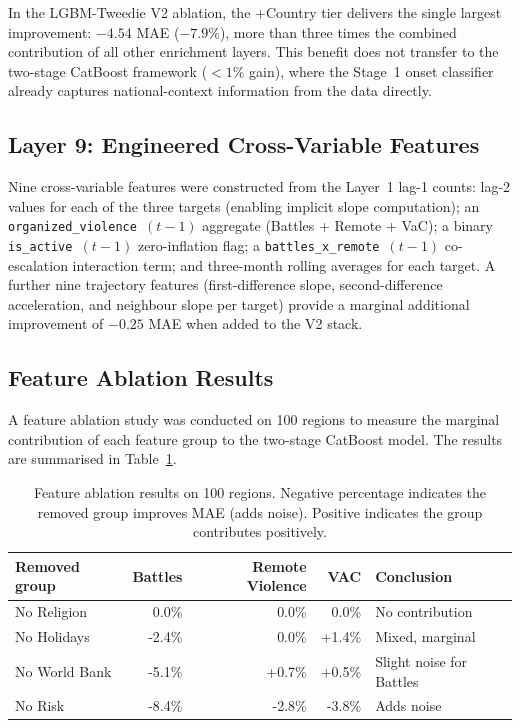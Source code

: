 \documentclass[12pt,a4paper]{article}
\begin{document}
In the LGBM-Tweedie V2 ablation, the +Country tier delivers the
single largest improvement: $-4.54$ MAE ($-7.9\%$), more than three
times the combined contribution of all other enrichment layers.
This benefit does not transfer to the two-stage CatBoost framework
($<1\%$ gain), where the Stage~1 onset classifier already captures
national-context information from the data directly.

\subsection{Layer 9: Engineered Cross-Variable Features}

Nine cross-variable features were constructed from the Layer~1
lag-1 counts: lag-2 values for each of the three targets (enabling
implicit slope computation); an \texttt{organized\_violence~$(t-1)$}
aggregate (Battles + Remote + VaC); a binary \texttt{is\_active~$(t-1)$}
zero-inflation flag; a \texttt{battles\_x\_remote~$(t-1)$}
co-escalation interaction term; and three-month rolling averages for
each target. A further nine trajectory features (first-difference
slope, second-difference acceleration, and neighbour slope per target)
provide a marginal additional improvement of $-0.25$ MAE when added
to the V2 stack.

\subsection{Feature Ablation Results}

A feature ablation study was conducted on 100 regions to measure the
marginal contribution of each feature group to the two-stage CatBoost
model. The results are summarised in Table~\ref{tab:ablation_features}.

\begin{table}[h]
\centering
\caption{Feature ablation results on 100 regions. Negative percentage
indicates the removed group improves MAE (adds noise). Positive
indicates the group contributes positively.}
\label{tab:ablation_features}
\begin{tabular}{lrrrl}
\toprule
Removed group & Battles & Remote Violence & VAC & Conclusion \\
\midrule
No Religion    & 0.0\%   & 0.0\%   & 0.0\%  & No contribution \\
No Holidays    & -2.4\%  & 0.0\%   & +1.4\% & Mixed, marginal \\
No World Bank  & -5.1\%  & +0.7\%  & +0.5\% & Slight noise for Battles \\
No Risk        & -8.4\%  & -2.8\%  & -3.8\% & Adds noise \\
\bottomrule
\end{tabular}
\end{table}
\end{document}
